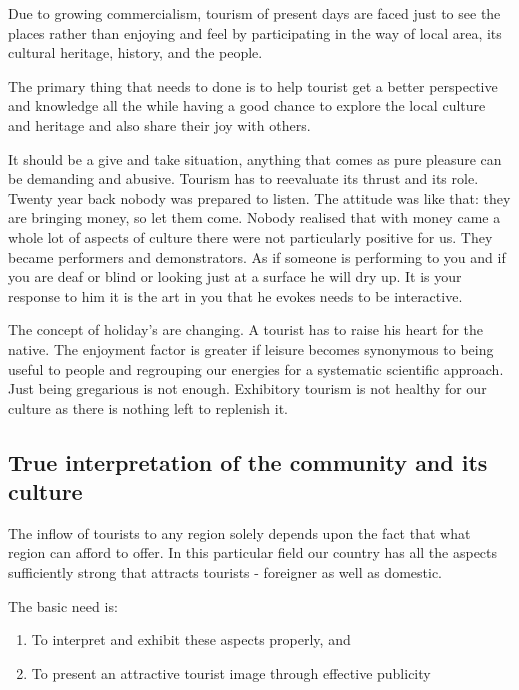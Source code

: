 Due to growing commercialism, tourism of present days are faced just to see the places rather than enjoying and feel by participating in the way of local area, its cultural heritage, history, and the people.

The primary thing that needs to done is to help tourist get a better perspective and knowledge all the while having a good chance to explore the local culture and heritage and also share their joy with others.

It should be a give and take situation, anything that comes as pure pleasure can be demanding and abusive. Tourism has to reevaluate its thrust and its role. Twenty year back nobody was prepared to listen. The attitude was like that: they are bringing money, so let them come. Nobody realised that with money came a whole lot of aspects of culture there were not particularly positive for us. They became performers and demonstrators. As if someone is performing to you and if you are deaf or blind or looking just at a surface he will dry up. It is your response to him it is the art in you that he evokes needs to be interactive.

The concept of holiday's are changing. A tourist has to raise his heart for the native. The enjoyment factor is greater if leisure becomes synonymous to being useful to people and regrouping our energies for a systematic scientific approach. Just being gregarious is not enough. Exhibitory tourism is not healthy for our culture as there is nothing left to replenish it.


\subsection{True interpretation of the community and its culture} %
\label{sub:tic}

The inflow of tourists to any region solely depends upon the fact that what region can afford to offer. In this particular field our country has all the aspects sufficiently strong that attracts tourists - foreigner as well as domestic.

The basic need is:

\begin{enumerate}
  \item To interpret and exhibit these aspects properly, and
  \item To present an attractive tourist image through effective publicity
\end{enumerate}

